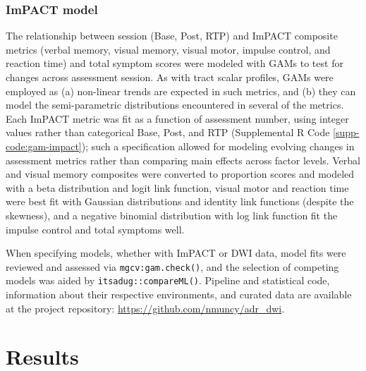\documentclass[12pt]{article}
\begin{document}
\subsubsection{ImPACT model}
\label{sssec:meth-gam-impact}
The relationship between session (Base, Post, RTP) and ImPACT composite metrics (verbal memory, visual memory, visual motor, impulse control, and reaction time) and total symptom scores were modeled with GAMs to test for changes across assessment session. As with tract scalar profiles, GAMs were employed as (a) non-linear trends are expected in such metrics, and (b) they can model the semi-parametric distributions encountered in several of the metrics. Each ImPACT metric was fit as a function of assessment number, using integer values rather than categorical Base, Post, and RTP (Supplemental R Code \ref{supp-code:gam-impact}); such a specification allowed for modeling evolving changes in assessment metrics rather than comparing main effects across factor levels. Verbal and visual memory composites were converted to proportion scores and modeled with a beta distribution and logit link function, visual motor and reaction time were best fit with Gaussian distributions and identity link functions (despite the skewness), and a negative binomial distribution with log link function fit the impulse control and total symptoms well.

When specifying models, whether with ImPACT or DWI data, model fits were reviewed and assessed via \lstinline{mgcv:gam.check()}, and the selection of competing models was aided by \lstinline{itsadug::compareML()}. Pipeline and statistical code, information about their respective environments, and curated data are available at the project repository: \url{https://github.com/nmuncy/adr_dwi}.


\section{Results}
\label{sec:res}
\end{document}
